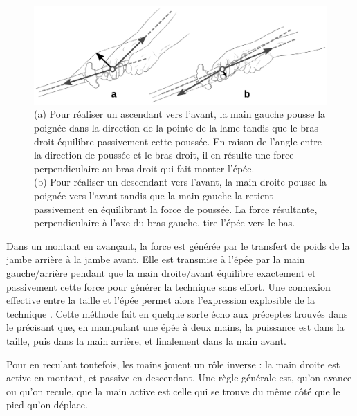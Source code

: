 \begin{figure}[ht]
	\centering
	
	\includegraphics[width=1.00\textwidth]{../../Images/JibenJianfa/Duo/DuoDetail.pdf}
	\caption[Équilibre des forces dans le \Duo{}]{(a) Pour réaliser un \Duo{} ascendant vers l'avant, la main gauche pousse la poignée dans la direction de la pointe de la lame tandis que le bras droit équilibre passivement cette poussée. En raison de l'angle entre la direction de poussée et le bras droit, il en résulte une force perpendiculaire au bras droit qui fait monter l'épée.\\
	(b) Pour réaliser un \Duo{} descendant vers l'avant, la main droite pousse la poignée vers l'avant tandis que la main gauche la retient passivement en équilibrant la force de poussée. La force résultante, perpendiculaire à l'axe du bras gauche, tire l'épée vers le bas.
	}
	\label{fig:duo_detail}
\end{figure} 

Dans un \Duo{} montant en avançant, la force est générée par le transfert de poids de la jambe arrière à la jambe avant. Elle est transmise à l'épée par la main gauche/arrière pendant que la main droite/avant équilibre exactement et passivement cette force pour générer la technique sans effort. Une connexion effective entre la taille et l'épée permet alors l'expression explosible de la technique \Duo{}.
Cette méthode fait en quelque sorte écho aux préceptes trouvés dans le \JianJing{}  précisant que, en manipulant une épée à deux mains, la puissance est dans la taille, puis dans la main arrière, et finalement dans la main avant.

Pour \Duo{} en reculant toutefois, les mains jouent un rôle inverse : la main droite est active en montant, et passive en descendant. Une règle générale est, qu'on avance ou qu'on recule, que la main active est celle qui se trouve du même côté que le pied qu'on déplace.

